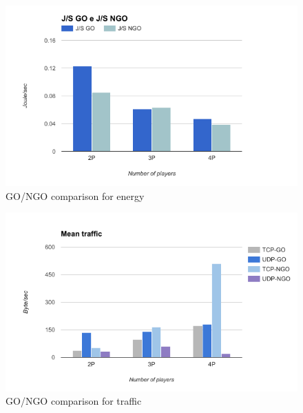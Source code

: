 \begin{figure}[H]
	\includegraphics[width=\columnwidth]{img/energy.png}
	
	\caption{GO/NGO comparison for energy}\label{fig:energy}
\end{figure}

\begin{figure}[H]
\includegraphics[width=\columnwidth]{img/traffic.png}

\caption{GO/NGO comparison for traffic}\label{fig:traffic}
\end{figure}

